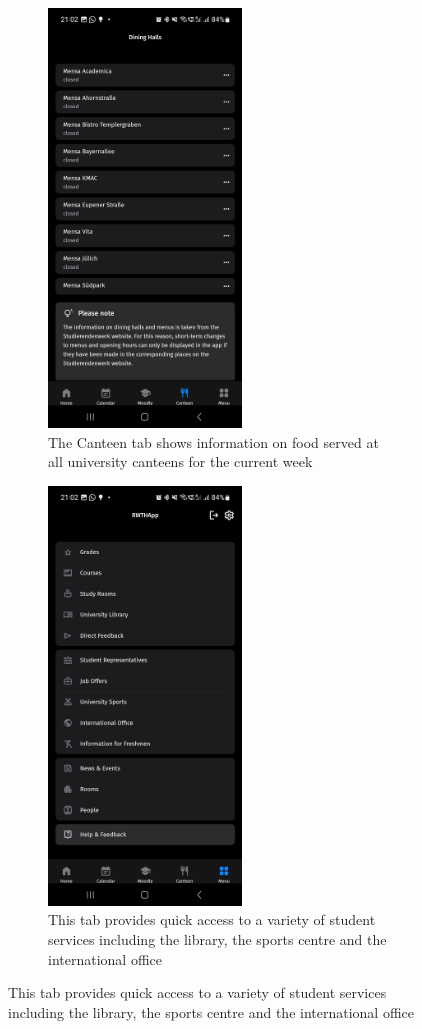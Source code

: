 \begin{figure}[t!]
	\centering
	\begin{subfigure}[T]{0.3\textwidth}
		\includegraphics[height=30em]{figures/Screenshot_canteen_RWTHApp.jpg}
		\caption{The Canteen tab shows information on food  served at all university canteens for the current week}
		\label{fig:app_canteen}
	\end{subfigure}
	\hspace{15px}
	\begin{subfigure}[T]{0.3\textwidth}
		\includegraphics[height=30em]{figures/Screenshot_menu_RWTHApp.jpg}
		\caption{This tab provides quick access to a variety of student services including the library, the sports centre and the international office}
		\label{fig:app_menu}
	\end{subfigure}
	\label{fig_app_2}
\end{figure}

